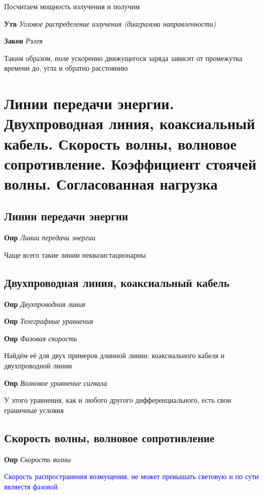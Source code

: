 \documentclass[a4paper, 14pt]{article}
\begin{document}
    Посчитаем мощность излучения и получим
    
    \textbf{Утв} \textit{Угловое распределение излучения (диаграмма направленности)}
    
    \textbf{Закон} \textit{Рэлея}
    
    Таким образом, поле ускоренно движущегося заряда зависит от промежутка времени до, угла и обратно расстоянию
    
    \section{Линии передачи энергии.
    Двухпроводная линия, коаксиальный кабель.
    Скорость волны, волновое сопротивление.
    Коэффициент стоячей волны.
    Согласованная нагрузка}
    
    \subsection{Линии передачи энергии}
    
    \textbf{Опр} \textit{Линии передачи энергии}
    
    Чаще всего такие линии неквазистационарны
    
    \subsection{Двухпроводная линия, коаксиальный кабель}
    
    \textbf{Опр} \textit{Двухпроводная линия}
    
    \textbf{Опр} \textit{Телеграфные уравнения}
    
    \textbf{Опр} \textit{Фазовая скорость}
    
    Найдём её для двух примеров длинной линии: коаксиального кабеля и двухпроводной линии
    
    \textbf{Опр} \textit{Волновое уравнение сигнала}
    
    У этого уравнения, как и любого другого дифференциального, есть свои граничные условия
    
    \subsection{Скорость волны, волновое сопротивление}
    
    \textbf{Опр} \textit{Скорость волны}
    
    \textcolor{blue}{Скорость распространения возмущения, не может превышать световую и по сути являестя фазовой}
    
\end{document}
